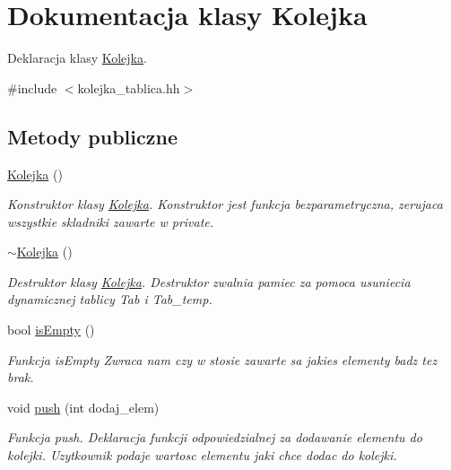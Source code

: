 \hypertarget{class_kolejka}{\section{\-Dokumentacja klasy \-Kolejka}
\label{class_kolejka}
}


\-Deklaracja klasy \hyperlink{class_kolejka}{\-Kolejka}.  




{\ttfamily \#include $<$kolejka\-\_\-tablica.\-hh$>$}

\subsection*{\-Metody publiczne}
\begin{DoxyCompactItemize}
\item 
\hyperlink{class_kolejka_a37c886fdc73dce62b04da0381dec5484}{\-Kolejka} ()
\begin{DoxyCompactList}\small\item\em \-Konstruktor klasy \hyperlink{class_kolejka}{\-Kolejka}. \-Konstruktor jest funkcja bezparametryczna, zerujaca wszystkie skladniki zawarte w private. \end{DoxyCompactList}\item 
\hyperlink{class_kolejka_a352f86ff08cd47be6c35c60bb0f873a6}{$\sim$\-Kolejka} ()
\begin{DoxyCompactList}\small\item\em \-Destruktor klasy \hyperlink{class_kolejka}{\-Kolejka}. \-Destruktor zwalnia pamiec za pomoca usuniecia dynamicznej tablicy \-Tab i \-Tab\-\_\-temp. \end{DoxyCompactList}\item 
bool \hyperlink{class_kolejka_a0106bd9157a970b63a06edd1dad350a9}{is\-Empty} ()
\begin{DoxyCompactList}\small\item\em \-Funkcja is\-Empty \-Zwraca nam czy w stosie zawarte sa jakies elementy badz tez brak. \end{DoxyCompactList}\item 
void \hyperlink{class_kolejka_ae69532510bff2585c5dfe6c6d40a779d}{push} (int dodaj\-\_\-elem)
\begin{DoxyCompactList}\small\item\em \-Funkcja push. \-Deklaracja funkcji odpowiedzialnej za dodawanie elementu do kolejki. \-Uzytkownik podaje wartosc elementu jaki chce dodac do kolejki. \end{DoxyCompactList}\item 

\end{DoxyCompactItemize}
